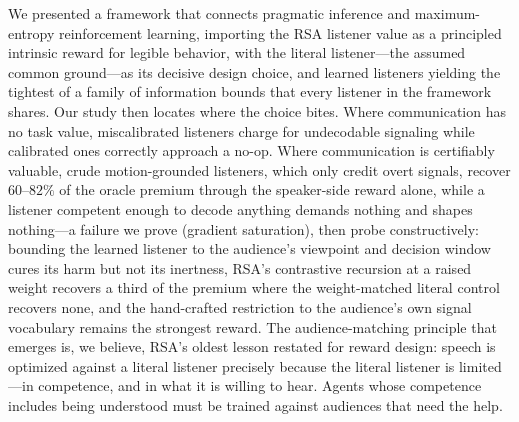 \documentclass{article}
\begin{document}
We presented a framework that connects pragmatic inference and maximum-entropy reinforcement learning, importing the RSA listener value as a principled intrinsic reward for legible behavior, with the literal listener---the assumed common ground---as its decisive design choice, and learned listeners yielding the tightest of a family of information bounds that every listener in the framework shares. Our study then locates where the choice bites. Where communication has no task value, miscalibrated listeners charge for undecodable signaling while calibrated ones correctly approach a no-op. Where communication is certifiably valuable, crude motion-grounded listeners, which only credit overt signals, recover $60$--$82\%$ of the oracle premium through the speaker-side reward alone, while a listener competent enough to decode anything demands nothing and shapes nothing---a failure we prove (gradient saturation), then probe constructively: bounding the learned listener to the audience's viewpoint and decision window cures its harm but not its inertness, RSA's contrastive recursion at a raised weight recovers a third of the premium where the weight-matched literal control recovers none, and the hand-crafted restriction to the audience's own signal vocabulary remains the strongest reward. The audience-matching principle that emerges is, we believe, RSA's oldest lesson restated for reward design: speech is optimized against a literal listener precisely because the literal listener is limited---in competence, and in what it is willing to hear. Agents whose competence includes being understood must be trained against audiences that need the help.

\vfill\pagebreak

\appendix
\end{document}
